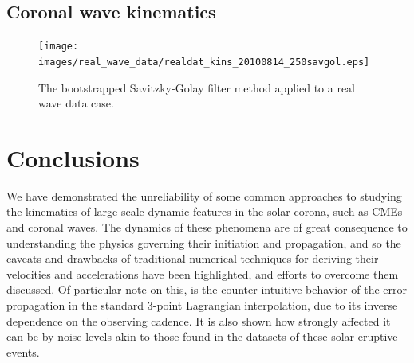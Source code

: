 \documentclass[structabstract]{aa}
\begin{document}





\subsection{Coronal wave kinematics}
\label{subsect:corpita}

\begin{figure}[!t]
\centering
\texttt{[image: images/real\_wave\_data/realdat\_kins\_20100814\_250savgol.eps]}
\caption{The bootstrapped Savitzky-Golay filter method applied to a real wave data case.} %
\label{fig_savgol_wave}
\end{figure}




\section{Conclusions}
\label{sect:conclusions}

We have demonstrated the unreliability of some common approaches to studying the kinematics of large scale dynamic features in the solar corona, such as CMEs and coronal waves. The dynamics of these phenomena are of great consequence to understanding the physics governing their initiation and propagation, and so the caveats and drawbacks of traditional numerical techniques for deriving their velocities and accelerations have been highlighted, and efforts to overcome them discussed. Of particular note on this, is the counter-intuitive behavior of the error propagation in the standard 3-point Lagrangian interpolation, due to its inverse dependence on the observing cadence. It is also shown how strongly affected it can be by noise levels akin to those found in the datasets of these solar eruptive events. 
\end{document}

